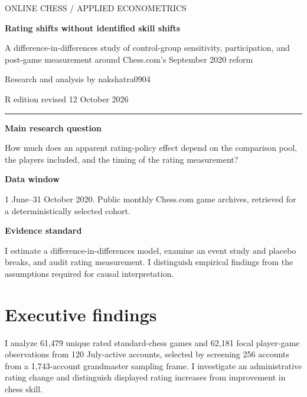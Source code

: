 \documentclass[11pt,a4paper]{article}
\begin{document}
\hypersetup{pageanchor=false}
\begin{titlepage}
\vspace*{1.1cm}
{\sffamily\color{accent}\large ONLINE CHESS / APPLIED ECONOMETRICS\par}
\vspace{1cm}
{\sffamily\bfseries\color{ink}\fontsize{30}{36}\selectfont Rating shifts without identified skill shifts\par}
\vspace{.7cm}
{\sffamily\Large A difference-in-differences study of control-group sensitivity, participation, and post-game measurement around Chess.com's September 2020 reform\par}
\vspace{1cm}
{\large Research and analysis by nakshatra0904\par}
{\large R edition revised 12 October 2026\par}
\vfill
\rule{\textwidth}{.7pt}
\vspace{.3cm}
\textbf{Main research question}\par
How much does an apparent rating-policy effect depend on the comparison pool, the players included, and the timing of the rating measurement?\par
\vspace{.3cm}
\textbf{Data window}\par
1 June--31 October 2020. Public monthly Chess.com game archives, retrieved for a deterministically selected cohort.\par
\vspace{.3cm}
\textbf{Evidence standard}\par
I estimate a difference-in-differences model, examine an event study and placebo breaks, and audit rating measurement. I distinguish empirical findings from the assumptions required for causal interpretation.\par
\end{titlepage}
\hypersetup{pageanchor=true}
\begingroup\small\setlength{\parskip}{0pt}\tableofcontents\endgroup\clearpage{}

\section{Executive findings}

I analyze 61,479 unique rated standard-chess games and 62,181 focal player-game observations from 120 July-active accounts, selected by screening 256 accounts from a 1,743-account grandmaster sampling frame. I investigate an administrative rating change and distinguish displayed rating increases from improvement in chess skill.
\end{document}
